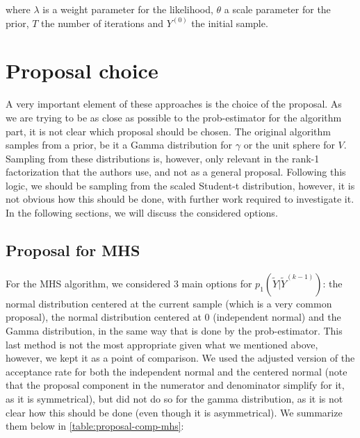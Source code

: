 \documentclass[12pt]{memoir}
\begin{document}
where $\lambda$ is a weight parameter for the likelihood, $\theta$ a scale parameter for the prior, $T$ the number of iterations and $Y^{(0)}$ the initial sample.\medbreak


\section{Proposal choice}\label{section:proposal-choice}

A very important element of these approaches is the choice of the proposal. As we are trying to be as close as possible to the prob-estimator for the algorithm part, it is not clear which proposal should be chosen. The original algorithm samples from a prior, be it a Gamma distribution for $\gamma$ or the unit sphere for $V$. Sampling from these distributions is, however, only relevant in the rank-1 factorization that the authors use, and not as a general proposal. Following this logic, we should be sampling from the scaled Student-t distribution, however, it is not obvious how this should be done, with further work required to investigate it. In the following sections, we will discuss the considered options.


\subsection*{Proposal for MHS}

For the MHS algorithm, we considered 3 main options for $p_1(\tilde Y| \tilde Y ^{(k-1)})$: the normal distribution centered at the current sample (which is a very common proposal), the normal distribution centered at 0 (independent normal) and the Gamma distribution, in the same way that is done by the prob-estimator. This last method is not the most appropriate given what we mentioned above, however, we kept it as a point of comparison. We used the adjusted version of the acceptance rate for both the independent normal and the centered normal (note that the proposal component in the numerator and denominator simplify for it, as it is symmetrical), but did not do so for the gamma distribution, as it is not clear how this should be done (even though it is asymmetrical). We summarize them below in \ref{table:proposal-comp-mhs}:
\end{document}

